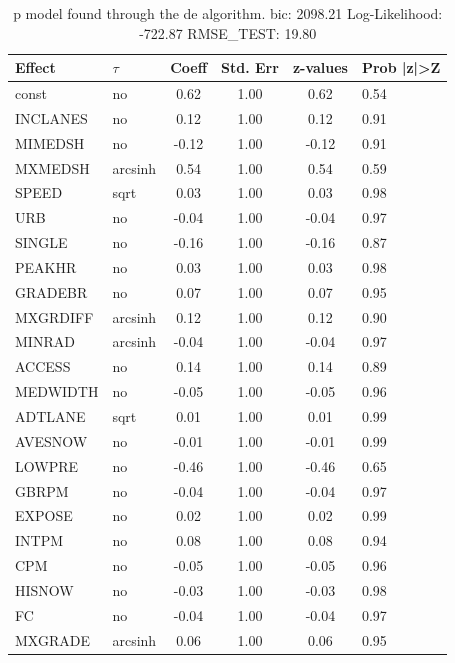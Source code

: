 \begin{table}
	\caption{p model found through the de algorithm. bic: 2098.21 Log-Likelihood: -722.87 RMSE_TEST: 19.80}
	\begin{center}
		\begin{tabular}{|l|l|c|c|c|l|}
			\hline
			Effect & $\tau$ & Coeff & Std. Err & z-values & Prob |z|>Z \\
			\hline
			const & no & 0.62 & 1.00 & 0.62 & 0.54 \\
			\hline
			INCLANES & no & 0.12 & 1.00 & 0.12 & 0.91 \\
			\hline
			MIMEDSH & no & -0.12 & 1.00 & -0.12 & 0.91 \\
			\hline
			MXMEDSH & arcsinh & 0.54 & 1.00 & 0.54 & 0.59 \\
			\hline
			SPEED & sqrt & 0.03 & 1.00 & 0.03 & 0.98 \\
			\hline
			URB & no & -0.04 & 1.00 & -0.04 & 0.97 \\
			\hline
			SINGLE & no & -0.16 & 1.00 & -0.16 & 0.87 \\
			\hline
			PEAKHR & no & 0.03 & 1.00 & 0.03 & 0.98 \\
			\hline
			GRADEBR & no & 0.07 & 1.00 & 0.07 & 0.95 \\
			\hline
			MXGRDIFF & arcsinh & 0.12 & 1.00 & 0.12 & 0.90 \\
			\hline
			MINRAD & arcsinh & -0.04 & 1.00 & -0.04 & 0.97 \\
			\hline
			ACCESS & no & 0.14 & 1.00 & 0.14 & 0.89 \\
			\hline
			MEDWIDTH & no & -0.05 & 1.00 & -0.05 & 0.96 \\
			\hline
			ADTLANE & sqrt & 0.01 & 1.00 & 0.01 & 0.99 \\
			\hline
			AVESNOW & no & -0.01 & 1.00 & -0.01 & 0.99 \\
			\hline
			LOWPRE & no & -0.46 & 1.00 & -0.46 & 0.65 \\
			\hline
			GBRPM & no & -0.04 & 1.00 & -0.04 & 0.97 \\
			\hline
			EXPOSE & no & 0.02 & 1.00 & 0.02 & 0.99 \\
			\hline
			INTPM & no & 0.08 & 1.00 & 0.08 & 0.94 \\
			\hline
			CPM & no & -0.05 & 1.00 & -0.05 & 0.96 \\
			\hline
			HISNOW & no & -0.03 & 1.00 & -0.03 & 0.98 \\
			\hline
			FC & no & -0.04 & 1.00 & -0.04 & 0.97 \\
			\hline
			MXGRADE & arcsinh & 0.06 & 1.00 & 0.06 & 0.95 \\

\end{tabular}
\end{center}
\end{table}
